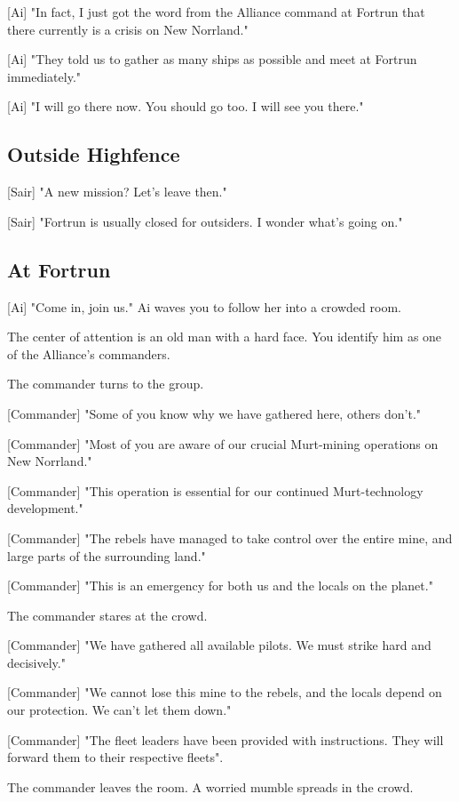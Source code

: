 \documentclass[a4paper,12pt]{article}
\begin{document}
[Ai] "In fact, I just got the word from the Alliance command at Fortrun that there currently is a crisis on New Norrland."

[Ai] "They told us to gather as many ships as possible and meet at Fortrun immediately."

[Ai] "I will go there now. You should go too. I will see you there."

\subsection{Outside Highfence}

[Sair] "A new mission? Let's leave then."

[Sair] "Fortrun is usually closed for outsiders. I wonder what's going on."

\subsection{At Fortrun}

[Ai] "Come in, join us." Ai waves you to follow her into a crowded room.

The center of attention is an old man with a hard face. You identify him
as one of the Alliance's commanders.

The commander turns to the group. 

[Commander] "Some of you know why we have gathered here,  others don't."

[Commander] "Most of you are aware of our crucial Murt-mining operations on New
Norrland." 

[Commander] "This operation is essential for our continued Murt-technology development."

[Commander] "The rebels have managed to take control over the entire mine, and large parts of the surrounding land." 

[Commander] "This is an emergency for both us and the locals on the planet."

The commander stares at the crowd. 

[Commander] "We have gathered all available pilots. We must strike hard and decisively."

[Commander] "We cannot lose this mine to the rebels, and the locals depend on our protection. We
can't let them down."

[Commander] "The fleet leaders have been provided with instructions. They will forward them to
their respective fleets".

The commander leaves the room. A worried mumble spreads in the crowd.
\end{document}
